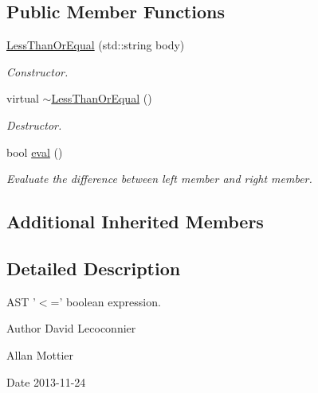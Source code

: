 \subsection*{Public Member Functions}
\begin{DoxyCompactItemize}
\item 
\hyperlink{class_less_than_or_equal_a2426e20f4e879e169e4554cd152ab4ae}{Less\-Than\-Or\-Equal} (std\-::string body)
\begin{DoxyCompactList}\small\item\em Constructor. \end{DoxyCompactList}\item 
\hypertarget{class_less_than_or_equal_ac7ff9a98ce2b5c5f83ba25f9b992f4b8}{virtual \hyperlink{class_less_than_or_equal_ac7ff9a98ce2b5c5f83ba25f9b992f4b8}{$\sim$\-Less\-Than\-Or\-Equal} ()}\label{class_less_than_or_equal_ac7ff9a98ce2b5c5f83ba25f9b992f4b8}

\begin{DoxyCompactList}\small\item\em Destructor. \end{DoxyCompactList}\item 
bool \hyperlink{class_less_than_or_equal_a54995a50037c8931b76767e64d038f3a}{eval} ()
\begin{DoxyCompactList}\small\item\em Evaluate the difference between left member and right member. \end{DoxyCompactList}\end{DoxyCompactItemize}
\subsection*{Additional Inherited Members}


\subsection{Detailed Description}
A\-S\-T '$<$=' boolean expression. 

\begin{DoxyAuthor}{Author}
David Lecoconnier 

Allan Mottier 
\end{DoxyAuthor}
\begin{DoxyDate}{Date}
2013-\/11-\/24 
\end{DoxyDate}


